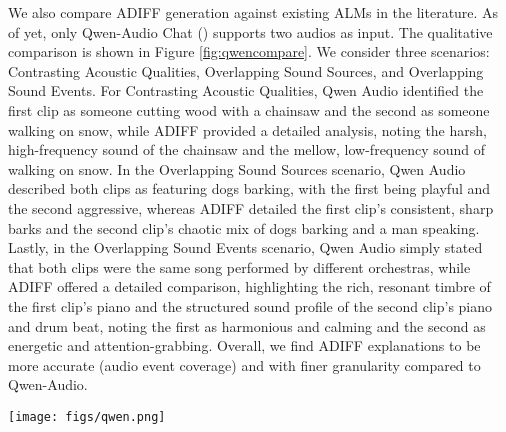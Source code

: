 We also compare ADIFF generation against existing ALMs in the literature. As of yet, only Qwen-Audio Chat (\cite{qwenaudio}) supports two audios as input. The qualitative comparison is shown in Figure \ref{fig:qwencompare}. We consider three scenarios: Contrasting Acoustic Qualities, Overlapping Sound Sources, and Overlapping Sound Events. For Contrasting Acoustic Qualities, Qwen Audio identified the first clip as someone cutting wood with a chainsaw and the second as someone walking on snow, while ADIFF provided a detailed analysis, noting the harsh, high-frequency sound of the chainsaw and the mellow, low-frequency sound of walking on snow. In the Overlapping Sound Sources scenario, Qwen Audio described both clips as featuring dogs barking, with the first being playful and the second aggressive, whereas ADIFF detailed the first clip's consistent, sharp barks and the second clip's chaotic mix of dogs barking and a man speaking. Lastly, in the Overlapping Sound Events scenario, Qwen Audio simply stated that both clips were the same song performed by different orchestras, while ADIFF offered a detailed comparison, highlighting the rich, resonant timbre of the first clip's piano and the structured sound profile of the second clip's piano and drum beat, noting the first as harmonious and calming and the second as energetic and attention-grabbing. Overall, we find ADIFF explanations to be more accurate (audio event coverage) and with finer granularity compared to Qwen-Audio. 

\begin{figure*}[ht]
   \centering
     \texttt{[image: figs/qwen.png]}
     \caption{\small Comparing ADIFF generation against current ALMs across three scenarios: Contrasting Acoustic Qualities, Overlapping Sound Sources, and Overlapping Sound Events. Notably, Qwen-Audio Chat is the only ALM in the literature that supports two audio inputs.
     }
     \label{fig:qwencompare}
\end{figure*}

